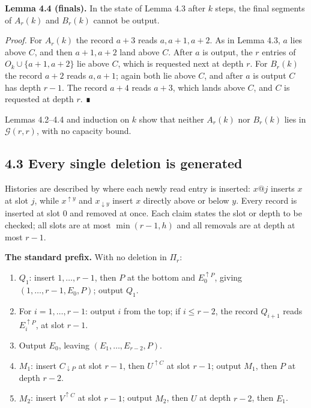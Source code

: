 \documentclass[11pt,letterpaper]{article}
\providecommand{\tightlist}{\setlength{\itemsep}{0pt}\setlength{\parskip}{0pt}}
\begin{document}
\textbf{Lemma 4.4 (finals).} In the state of Lemma 4.3 after \(k\)
steps, the final segments of \(A_r(k)\) and \(B_r(k)\) cannot be output.

\emph{Proof.} For \(A_r(k)\) the record \(a+3\) reads \(a,a+1,a+2\). As
in Lemma 4.3, \(a\) lies above \(C\), and then \(a+1,a+2\) land above
\(C\). After \(a\) is output, the \(r\) entries of
\(O_k\cup\{a+1,a+2\}\) lie above \(C\), which is requested next at depth
\(r\). For \(B_r(k)\) the record \(a+2\) reads \(a,a+1\); again both lie
above \(C\), and after \(a\) is output \(C\) has depth \(r-1\). The
record \(a+4\) reads \(a+3\), which lands above \(C\), and \(C\) is
requested at depth \(r\). ∎

Lemmas 4.2--4.4 and induction on \(k\) show that neither \(A_r(k)\) nor
\(B_r(k)\) lies in \(\mathcal G(r,r)\), with no capacity bound.

\subsection{4.3 Every single deletion is
generated}\label{every-single-deletion-is-generated-1}

Histories are described by where each newly read entry is inserted:
\(x@j\) inserts \(x\) at slot \(j\), while \(x^{\uparrow y}\) and
\(x_{\downarrow y}\) insert \(x\) directly above or below \(y\). Every
record is inserted at slot \(0\) and removed at once. Each claim states
the slot or depth to be checked; all slots are at most \(\min(r-1,h)\)
and all removals are at depth at most \(r-1\).

\textbf{The standard prefix.} With no deletion in \(\Pi_r\):

\begin{enumerate}
\def\labelenumi{\arabic{enumi}.}
\tightlist
\item
  \(Q_1\): insert \(1,\dots,r-1\), then \(P\) at the bottom and
  \(E_0^{\uparrow P}\), giving \((1,\dots,r-1,E_0,P)\); output \(Q_1\).
\item
  For \(i=1,\dots,r-1\): output \(i\) from the top; if \(i\le r-2\), the
  record \(Q_{i+1}\) reads \(E_i^{\uparrow P}\), at slot \(r-1\).
\item
  Output \(E_0\), leaving \((E_1,\dots,E_{r-2},P)\).
\item
  \(M_1\): insert \(C_{\downarrow P}\) at slot \(r-1\), then
  \(U^{\uparrow C}\) at slot \(r-1\); output \(M_1\), then \(P\) at
  depth \(r-2\).
\item
  \(M_2\): insert \(V^{\uparrow C}\) at slot \(r-1\); output \(M_2\),
  then \(U\) at depth \(r-2\), then \(E_1\).
\end{enumerate}
\end{document}
